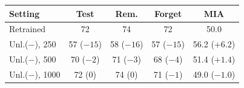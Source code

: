{\footnotesize\setlength{\tabcolsep}{3pt}
\begin{tabular}{@{}lcccc@{}}
\toprule
Setting & Test & Rem. & Forget & MIA \\
\midrule
Retrained & 72 & 74 & 72 & 50.0 \\
Unl.($-$), 250 & 57 ($-15$) & 58 ($-16$) & 57 ($-15$) & 56.2 ($+6.2$) \\
Unl.($-$), 500 & 70 ($-2$) & 71 ($-3$) & 68 ($-4$) & 51.4 ($+1.4$) \\
Unl.($-$), 1000 & 72 (0) & 74 (0) & 71 ($-1$) & 49.0 ($-1.0$) \\
\bottomrule
\end{tabular}}
